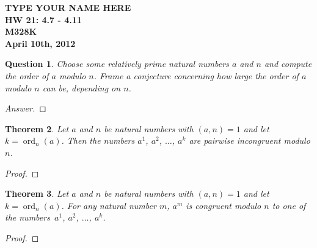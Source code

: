 \documentclass[12pt,leqno]{article}
\numberwithin{equation}{section}
\newtheorem{thm}{Theorem}[section]
\newtheorem{ques}[thm]{Question}
\theoremstyle{definition}
\newcommand{\ord}{\operatorname{ord}}
\begin{document}
\thispagestyle{plain}
\begin{flushright}
\large{\textbf{TYPE YOUR NAME HERE \\
HW 21: 4.7 - 4.11\\
M328K \\
April 10th, 2012 \\}}
\end{flushright}

\markboth{}{} \setcounter{section}{0} \baselineskip=18pt

\setcounter{tocdepth}{4}



\setcounter{section}{4}

\setcounter{thm}{6}


\begin{ques}
Choose some relatively prime natural numbers $a$ and $n$ and compute
the order of $a$ modulo $n$. Frame a conjecture concerning how large
the order of $a$ modulo $n$ can be, depending on $n$.
\end{ques}
\begin{proof}[Answer]
\end{proof}


\begin{thm}
Let $a$ and $n$ be natural numbers with $(a, n) = 1$ and let $k =
\ord_n(a)$.  Then the numbers $a^1$, $a^2$, $\dots$, $a^k$ are
pairwise incongruent modulo $n$.
\end{thm}
\begin{proof}[Proof]
\end{proof}

\begin{thm}
Let $a$ and $n$ be natural numbers with $(a, n) = 1$ and let $k =
\ord_n(a)$.  For any natural number $m$, $a^m$ is congruent modulo
$n$ to one of the numbers~$a^1$, $a^2$, $\hdots$, $a^k$.
\end{thm}
\begin{proof}[Proof]
\end{proof}
\end{document}
